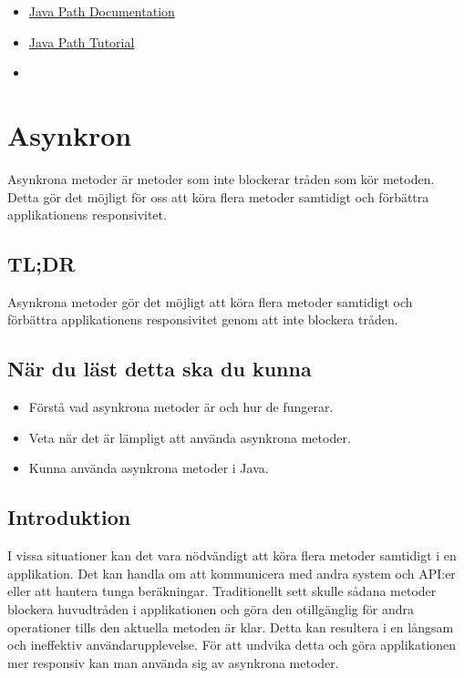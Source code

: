 \begin{itemize}
\tightlist
\item
  \href{https://docs.oracle.com/javase/8/docs/api/java/nio/file/Path.html}{Java
  Path Documentation}
\item
  \href{https://www.baeldung.com/java-nio-2-path}{Java Path Tutorial}
\item
\end{itemize}

\hypertarget{asynkron}{%
\section{Asynkron}\label{asynkron}}

Asynkrona metoder är metoder som inte blockerar tråden som kör metoden.
Detta gör det möjligt för oss att köra flera metoder samtidigt och
förbättra applikationens responsivitet.

\hypertarget{tldr}{%
\subsection{TL;DR}\label{tldr}}

Asynkrona metoder gör det möjligt att köra flera metoder samtidigt och
förbättra applikationens responsivitet genom att inte blockera tråden.

\hypertarget{nuxe4r-du-luxe4st-detta-ska-du-kunna}{%
\subsection{När du läst detta ska du
kunna}\label{nuxe4r-du-luxe4st-detta-ska-du-kunna}}

\begin{itemize}
\tightlist
\item
  Förstå vad asynkrona metoder är och hur de fungerar.
\item
  Veta när det är lämpligt att använda asynkrona metoder.
\item
  Kunna använda asynkrona metoder i Java.
\end{itemize}

\hypertarget{introduktion}{%
\subsection{Introduktion}\label{introduktion}}

I vissa situationer kan det vara nödvändigt att köra flera metoder
samtidigt i en applikation. Det kan handla om att kommunicera med andra
system och API:er eller att hantera tunga beräkningar. Traditionellt
sett skulle sådana metoder blockera huvudtråden i applikationen och göra
den otillgänglig för andra operationer tills den aktuella metoden är
klar. Detta kan resultera i en långsam och ineffektiv
användarupplevelse. För att undvika detta och göra applikationen mer
responsiv kan man använda sig av asynkrona metoder.

